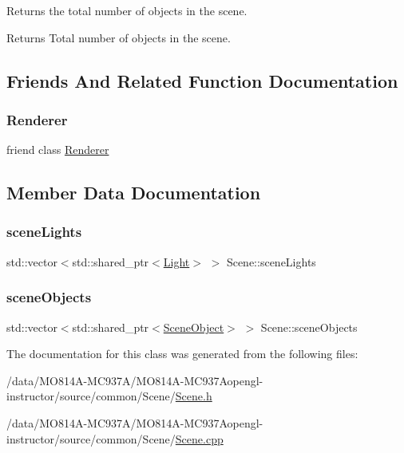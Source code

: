 Returns the total number of objects in the scene.

\begin{DoxyReturn}{Returns}
Total number of objects in the scene.
\end{DoxyReturn}


\subsection{Friends And Related Function Documentation}
\hypertarget{class_scene_a70538530bc36e033e360880ef311df61}{}\label{class_scene_a70538530bc36e033e360880ef311df61}
\subsubsection{\texorpdfstring{Renderer}{Renderer}}
{\footnotesize\ttfamily friend class \hyperlink{class_renderer}{Renderer}\hspace{0.3cm}{\ttfamily [friend]}}



\subsection{Member Data Documentation}
\hypertarget{class_scene_a847f4f9c485a56b084a1340811f0e726}{}\label{class_scene_a847f4f9c485a56b084a1340811f0e726}
\subsubsection{\texorpdfstring{scene\+Lights}{sceneLights}}
{\footnotesize\ttfamily std\+::vector$<$std\+::shared\+\_\+ptr$<$\hyperlink{class_light}{Light}$>$ $>$ Scene\+::scene\+Lights\hspace{0.3cm}{\ttfamily [private]}}

\hypertarget{class_scene_a871382922b2a04d7883cf6d34529b5df}{}\label{class_scene_a871382922b2a04d7883cf6d34529b5df}
\subsubsection{\texorpdfstring{scene\+Objects}{sceneObjects}}
{\footnotesize\ttfamily std\+::vector$<$std\+::shared\+\_\+ptr$<$\hyperlink{class_scene_object}{Scene\+Object}$>$ $>$ Scene\+::scene\+Objects\hspace{0.3cm}{\ttfamily [private]}}



The documentation for this class was generated from the following files\+:\begin{DoxyCompactItemize}
\item
/data/MO814A-MC937A/MO814A-MC937Aopengl-\/instructor/source/common/\+Scene/\hyperlink{_scene_8h}{Scene.\+h}\item
/data/MO814A-MC937A/MO814A-MC937Aopengl-\/instructor/source/common/\+Scene/\hyperlink{_scene_8cpp}{Scene.\+cpp}\end{DoxyCompactItemize}
